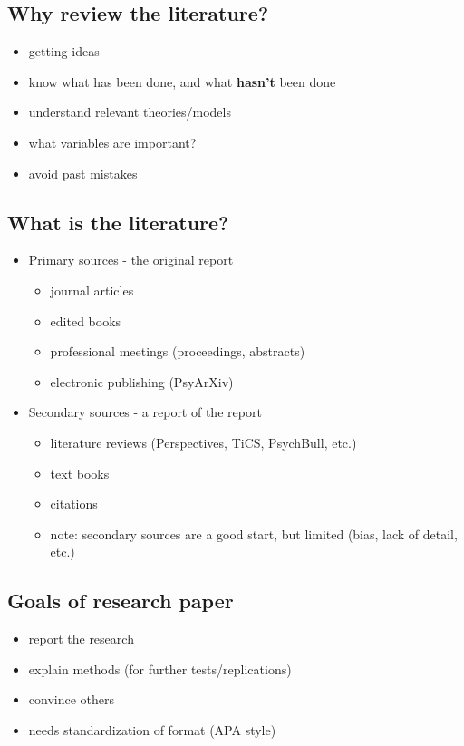 \documentclass[11pt]{article}
\begin{document}
\subsection*{Why review the literature?}
\label{sec-3-1}
\begin{itemize}
\item getting ideas
\item know what has been done, and what \textbf{hasn't} been done
\item understand relevant theories/models
\item what variables are important?
\item avoid past mistakes
\end{itemize}

\subsection*{What is the literature?}
\label{sec-3-2}
\begin{itemize}
\item Primary sources - the original report
\begin{itemize}
\item journal articles
\item edited books
\item professional meetings (proceedings, abstracts)
\item electronic publishing (PsyArXiv)
\end{itemize}
\item Secondary sources - a report of the report
\begin{itemize}
\item literature reviews (Perspectives, TiCS, PsychBull, etc.)
\item text books
\item citations
\item note: secondary sources are a good start, but limited (bias, lack of detail, etc.)
\end{itemize}
\end{itemize}

\subsection*{Goals of research paper}
\label{sec-3-3}
\begin{itemize}
\item report the research
\item explain methods (for further tests/replications)
\item convince others
\item needs standardization of format (APA style)
\end{itemize}
\end{document}
